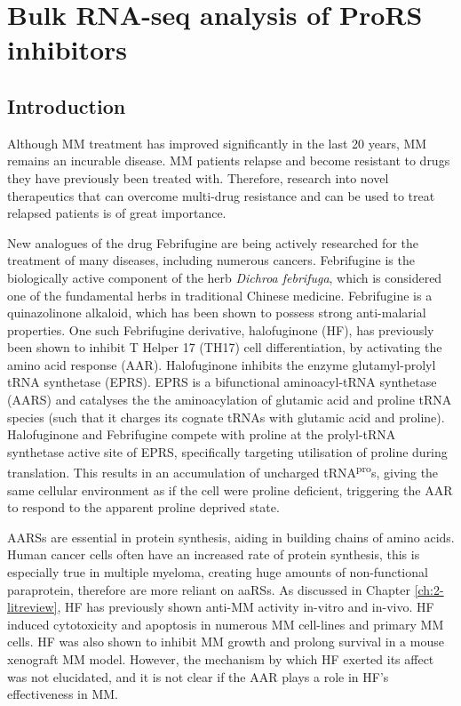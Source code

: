 \chapter{Bulk RNA-seq analysis of ProRS inhibitors}\label{ch:5-bulk}


\section{Introduction}
Although MM treatment has improved significantly in the last 20 years, MM remains an incurable disease.
MM patients relapse and become resistant to drugs they have previously been treated with.
Therefore, research into novel therapeutics that can overcome multi-drug resistance and can be used to treat relapsed patients is of great importance.

New analogues of the drug Febrifugine are being actively researched for the treatment of many diseases, including numerous cancers\cite{halo2012clin, halo2012clin2}.
Febrifugine is the biologically active component of the herb \textit{Dichroa febrifuga}, which is considered one of the fundamental herbs in traditional Chinese medicine\cite{koepfli1949alkaloids}.
Febrifugine is a quinazolinone alkaloid, which has been shown to possess strong anti-malarial properties.
One such Febrifugine derivative, halofuginone (HF), has previously been shown to inhibit T Helper 17 (TH17) cell differentiation, by activating the amino acid response (AAR)\cite{sundrud2009halofuginone}.
Halofuginone inhibits the enzyme glutamyl-prolyl tRNA synthetase (EPRS)\cite{keller2012halofuginone}.
EPRS is a bifunctional aminoacyl-tRNA synthetase (AARS) and catalyses the the aminoacylation of glutamic acid and proline tRNA species (such that it charges its cognate tRNAs with glutamic acid and proline).
Halofuginone and Febrifugine compete with proline at the prolyl-tRNA synthetase active site of EPRS, specifically targeting utilisation of proline during translation\cite{keller2012halofuginone}.
This results in an accumulation of uncharged tRNA\textsuperscript{pro}s, giving the same cellular environment as if the cell were proline deficient, triggering the AAR to respond to the apparent proline deprived state.

AARSs are essential in protein synthesis, aiding in building chains of amino acids.
Human cancer cells often have an increased rate of protein synthesis, this is especially true in multiple myeloma, creating huge amounts of non-functional paraprotein, therefore are more reliant on aaRSs.
As discussed in Chapter \ref{ch:2-litreview}, HF has previously shown anti-MM activity in-vitro and in-vivo\cite{leiba2012halofuginone}.
HF induced cytotoxicity and apoptosis in numerous MM cell-lines and primary MM cells.
HF was also shown to inhibit MM growth and prolong survival in a mouse xenograft MM model.
However, the mechanism by which HF exerted its affect was not elucidated, and it is not clear if the AAR plays a role in HF's effectiveness in MM\@.

